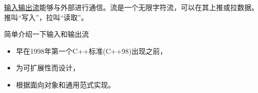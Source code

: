 
\href{http://en.cppreference.com/w/cpp/header/iostream}{输入输出流}能够与外部进行通信。流是一个无限字符流，可以在其上推或拉数据。推叫“写入”，拉叫“读取”。

简单介绍一下输入和输出流

\begin{itemize}
\item 
早在1998年第一个C++标准(C++98)出现之前，

\item 
为可扩展性而设计，

\item 
根据面向对象和通用范式实现。
\end{itemize}























































